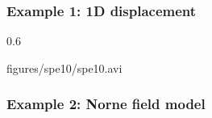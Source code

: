 \documentclass[screen, aspectratio=43]{beamer}
\begin{document}
\begin{frame}
  \frametitle{Example 1: 1D displacement}
  \centering
  \begin{mybox}{}{0.6\textheight}
    \begin{center}
    {figures/spe10/spe10.avi}
    \end{center}
  \end{mybox}
\end{frame}




\begin{frame}
  \frametitle{Example 2: Norne field model}
  
\end{frame}
\end{document}
